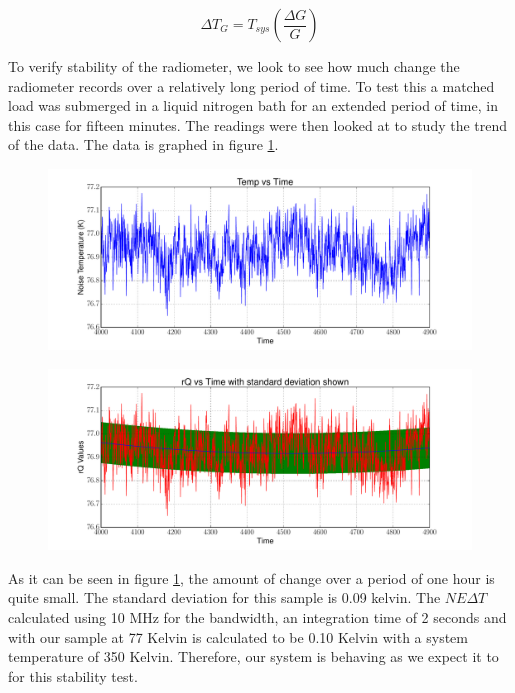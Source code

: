 \begin{equation} \label{eq:rad_stability}
\Delta T_G=T_{sys} \left(\frac{\Delta G}{G}\right)
\end{equation}

To verify stability of the radiometer, we look to see how much change the radiometer records over a relatively long period of time.  To test this a matched load was submerged in a liquid nitrogen bath for an extended period of time, in this case for fifteen minutes.  The readings were then looked at to study the trend of the data.  The data is graphed in figure \ref{Stability}.

\begin{figure}[h!tb] \centering
\includegraphics[width=\textwidth]{Experiments/Exp2/sdr_calibrated_zoom.pdf}
\label{Stability}
\end{figure}

\begin{figure}[h!tb] \centering
\includegraphics[width=\textwidth]{Experiments/Exp2/calib_vstime_stddev.pdf}
\label{Stability_calib}
\end{figure}

As it can be seen in figure \ref{Stability}, the amount of change over a period of one hour is quite small.  The standard deviation for this sample is 0.09 kelvin.  The $NE\Delta T$ calculated using 10 MHz for the bandwidth, an integration time of 2 seconds and with our sample at 77 Kelvin is calculated to be 0.10 Kelvin with a system temperature of 350 Kelvin.  Therefore, our system is behaving as we expect it to for this stability test.


